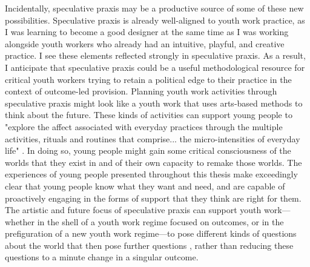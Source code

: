 Incidentally, speculative praxis may be a productive source of some of these new possibilities. Speculative praxis is already well-aligned to youth work practice, as I was learning to become a good designer at the same time as I was working alongside youth workers who already had an intuitive, playful, and creative practice. I see these elements reflected strongly in speculative praxis. As a result, I anticipate that speculative praxis could be a useful methodological resource for critical youth workers trying to retain a political edge to their practice in the context of outcome-led provision. Planning youth work activities through speculative praxis might look like a youth work that uses arts-based methods to think about the future. These kinds of activities can support young people to "explore the affect associated with everyday practices through the multiple activities, rituals and routines that comprise... the micro-intensities of everyday life" \citep[p. 528]{coleman_sensory_2017}. In doing so, young people might gain some critical consciousness of the worlds that they exist in and of their own capacity to remake those worlds. The experiences of young people presented throughout this thesis make exceedingly clear that young people know what they want and need, and are capable of proactively engaging in the forms of support that they think are right for them. The artistic and future focus of speculative praxis can support youth work—whether in the shell of a youth work regime focused on outcomes, or in the prefiguration of a new youth work regime—to pose different kinds of questions about the world that then pose further questions \citep[p. 55]{coleman_glitterworlds_2020}, rather than reducing these questions to a minute change in a singular outcome. 

